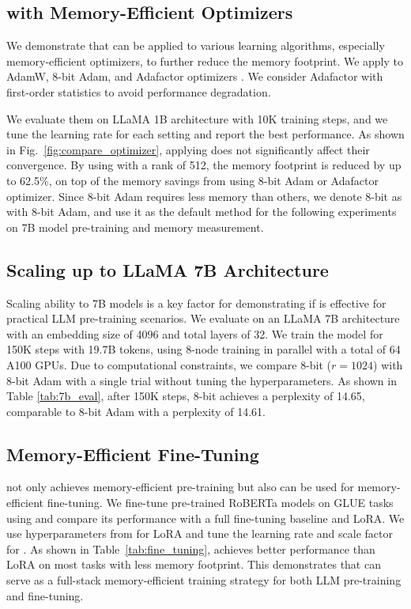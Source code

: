 \subsection{\lowrank{} with Memory-Efficient Optimizers}
We demonstrate that \lowrank{} can be applied to various learning algorithms, especially memory-efficient optimizers, to further reduce the memory footprint.
We apply \lowrank{} to AdamW, 8-bit Adam, and Adafactor optimizers \citep{shazeerAdafactorAdaptiveLearning, loshchilovDecoupledWeightDecay2019,dettmers8bitOptimizersBlockwise2021}.
We consider Adafactor with first-order statistics to avoid performance degradation.

We evaluate them on LLaMA 1B architecture with 10K training steps, and we tune the learning rate for each setting and report the best performance.
As shown in Fig.~\ref{fig:compare_optimizer}, applying \lowrank{} does not significantly affect their convergence.
By using \lowrank{} with a rank of 512, the memory footprint is reduced by up to 62.5\%, on top of the memory savings from using 8-bit Adam or Adafactor optimizer.
Since 8-bit Adam requires less memory than others, we denote 8-bit \lowrank{} as \lowrank{} with 8-bit Adam, and use it as the default method for the following experiments on 7B model pre-training and memory measurement.


\subsection{Scaling up to LLaMA 7B Architecture}
Scaling ability to 7B models is a key factor for demonstrating if \lowrank is effective for practical LLM pre-training scenarios.
We evaluate \lowrank{} on an LLaMA 7B architecture with an embedding size of 4096 and total layers of 32.
We train the model for 150K steps with 19.7B tokens, using 8-node training in parallel with a total of 64 A100 GPUs.
Due to computational constraints, we compare 8-bit \lowrank{} ($r=1024$) with 8-bit Adam with a single trial without tuning the hyperparameters.   
As shown in Table \ref{tab:7b_eval}, after 150K steps, 8-bit \lowrank{} achieves a perplexity of 14.65, comparable to 8-bit Adam with a perplexity of 14.61.




\subsection{Memory-Efficient Fine-Tuning}
\lowrank{} not only achieves memory-efficient pre-training but also can be used for memory-efficient fine-tuning.
We fine-tune pre-trained RoBERTa models on GLUE tasks using \lowrank{} and compare its performance with a full fine-tuning baseline and LoRA.
We use hyperparameters from \citet{huLoRALowRankAdaptation2021} for LoRA and tune the learning rate and scale factor for \lowrank{}.
As shown in Table~\ref{tab:fine_tuning}, \lowrank{} achieves better performance than LoRA on most tasks with less memory footprint.
This demonstrates that \lowrank{} can serve as a full-stack memory-efficient training strategy for both LLM pre-training and fine-tuning.

